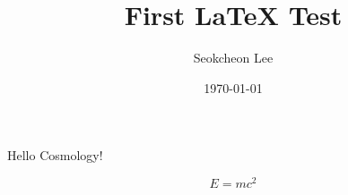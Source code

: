 \documentclass{article}
\title{First LaTeX Test}
\author{Seokcheon Lee}
\date{\today}
\begin{document}
\maketitle

Hello Cosmology!

\[
E = mc^2
\]
\end{document}
